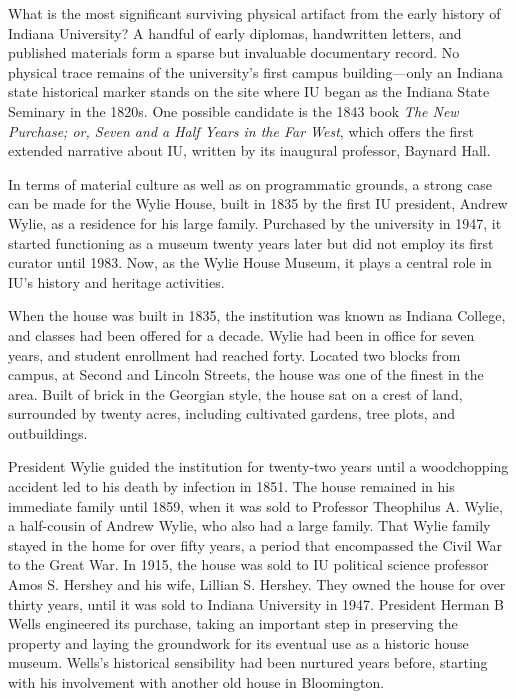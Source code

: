\documentclass[
  american,
  letterpaper,
]{scrreprt}
\begin{document}
What is the most significant surviving physical artifact from the early
history of Indiana University? A handful of early diplomas, handwritten
letters, and published materials form a sparse but invaluable
documentary record. No physical trace remains of the university's first
campus building---only an Indiana state historical marker stands on the
site where IU began as the Indiana State Seminary in the 1820s. One
possible candidate is the 1843 book \emph{The New Purchase; or, Seven
and a Half Years in the Far West}, which offers the first extended
narrative about IU, written by its inaugural professor, Baynard Hall.

In terms of material culture as well as on programmatic grounds, a
strong case can be made for the Wylie House, built in 1835 by the first
IU president, Andrew Wylie, as a residence for his large family.
Purchased by the university in 1947, it started functioning as a museum
twenty years later but did not employ its first curator until 1983. Now,
as the Wylie House Museum, it plays a central role in IU's history and
heritage activities.

When the house was built in 1835, the institution was known as Indiana
College, and classes had been offered for a decade. Wylie had been in
office for seven years, and student enrollment had reached forty.
Located two blocks from campus, at Second and Lincoln Streets, the house
was one of the finest in the area. Built of brick in the Georgian style,
the house sat on a crest of land, surrounded by twenty acres, including
cultivated gardens, tree plots, and outbuildings.

President Wylie guided the institution for twenty-two years until a
woodchopping accident led to his death by infection in 1851. The house
remained in his immediate family until 1859, when it was sold to
Professor Theophilus A. Wylie, a half-cousin of Andrew Wylie, who also
had a large family. That Wylie family stayed in the home for over fifty
years, a period that encompassed the Civil War to the Great War. In
1915, the house was sold to IU political science professor Amos S.
Hershey and his wife, Lillian S. Hershey. They owned the house for over
thirty years, until it was sold to Indiana University in 1947. President
Herman B Wells engineered its purchase, taking an important step in
preserving the property and laying the groundwork for its eventual use
as a historic house museum. Wells's historical sensibility had been
nurtured years before, starting with his involvement with another old
house in Bloomington.
\end{document}
